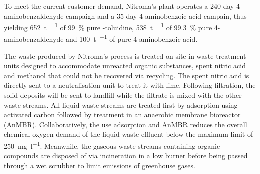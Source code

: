 To meet the current customer demand, Nitroma's plant operates a 240-day 4-aminobenzaldehyde campaign and a 35-day 4-aminobenzoic acid campain, thus yielding \SI{652}{\tonne\per\year} of \SI{99}{\percent} pure \ortho-toluidine, \SI{538}{\tonne\per\year} of \SI{99.3}{\percent} pure 4-aminobenzaldehyde and \SI{100}{\tonne\per\year} of pure 4-aminobenzoic acid.

The waste produced by Nitroma's process is treated on-site in waste treatment units designed to accommodate unreacted organic substances, spent nitric acid and methanol that could not be recovered via recycling. The spent nitric acid is directly sent to a neutralisation unit to treat it with lime. Following filtration, the solid deposits will be sent to landfill while the filtrate is mixed with the other waste streams. All liquid waste streams are treated first by adsorption using activated carbon followed by treatment in an anaerobic membrane bioreactor (AnMBR). Collaboratively, the use adsorption and AnMBR reduces the overall chemical oxygen demand of the liquid waste effluent below the maximum limit of \SI{250}{\mg\per\litre}. Meanwhile, the gaseous waste streams containing organic compounds are disposed of via incineration in a low  burner before being passed through a wet scrubber to limit emissions of greenhouse gases.
